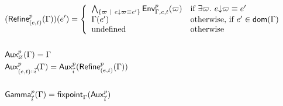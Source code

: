\documentclass[a4paper]{article}
\theoremstyle{definition}
\begin{document}
    \begin{align*}
      &(\textsf{Refine}^{p}_{(e,t)}(\Gamma))(e') = 
        \left\{\begin{array}{ll}
          \bigwedge_{\{\varpi ~|~ e{\downarrow}\varpi \equiv e'\}} \textsf{Env}^{p}_{\Gamma,e,t} (\varpi) & \text{if } \exists \varpi.\ e{\downarrow}\varpi \equiv e' \\
          \Gamma(e') & \text{otherwise, if } e' \in \textsf{dom}(\Gamma)\\
          \text{undefined} & \text{otherwise}
        \end{array}\right.\\&\\
      &\textsf{Aux}^{p}_{\varnothing}(\Gamma) = \Gamma\\
      &\textsf{Aux}^{p}_{{(e,t)}\textsf{::}{\vec i}}(\Gamma) = \textsf{Aux}^{p}_{\vec i}(\textsf{Refine}^{p}_{(e,t)}(\Gamma))\\&\\
      &\textsf{Gamma}^{p}_{\vec {i}}(\Gamma)=\textsf{fixpoint}_\Gamma (\textsf{Aux}^{p}_{\vec {i}})
    \end{align*}
\end{document}
